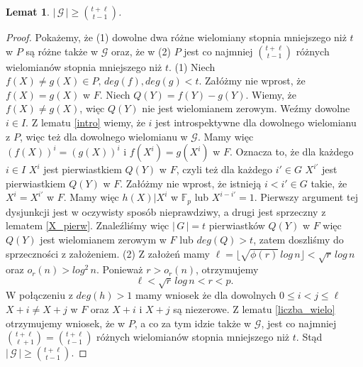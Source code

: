\documentclass[declaration,shortabstract]{iithesis}
\theoremstyle{definition}
\theoremstyle{remark} \newtheorem{observation}{Obserwacja}
\theoremstyle{plain} \newtheorem{theorem}{Twierdzenie}
\theoremstyle{plain} \newtheorem{lemma}{Lemat}
\theoremstyle{remark} \newtheorem*{remark*}{Uwaga}
\theoremstyle{reminder} \newtheorem*{reminder*}{Przypomnienie}
\begin{document}
\begin{lemma} \label{lower}
	$| \, \mathcal{G} \,| \geq {t + \ell \choose t - 1}$.
\end{lemma}
	
\begin{proof}
	Pokażemy, że (1) dowolne dwa różne wielomiany stopnia mniejszego niż $t$ w $P$ są różne także w $\mathcal{G}$ oraz, że w (2) $P$ jest co najmniej  ${t + \ell \choose t - 1}$ różnych wielomianów stopnia mniejszego niż $t$. 
	\newline
	(1) Niech $f(X) \neq g(X) \in P, \, deg(f), deg(g) < t$. Załóżmy nie wprost, że $f(X) = g(X)$ w $F$. 
	Niech $Q(Y) = f(Y) - g(Y)$. Wiemy, że $f(X) \neq g(X)$, więc $Q(Y)$ nie jest wielomianem zerowym. Weźmy dowolne $i \in I$. Z lematu \ref{intro} wiemy, że $i$ jest introspektywne dla dowolnego wielomianu z $P$, więc też dla dowolnego wielomianu w $\mathcal{G}$. Mamy więc $(f(X))^i = (g(X))^i$ i $f(X^i) = g(X^i)$ w $F$. Oznacza to, że dla każdego $i \in I$ $X^i$ jest pierwiastkiem $Q(Y)$ w $F$, czyli też dla każdego $i' \in G$ $X^{i'}$ jest pierwiastkiem $Q(Y)$ w $F$. Załóżmy nie wprost, że istnieją $i < i' \in G$ takie, że $X^i = X^{i'}$ w $F$. Mamy więc $h(X) | X^i$ w $\mathbb{F}_p$ lub $X^{i - i'} = 1$. Pierwszy argument tej dysjunkcji jest w oczywisty sposób nieprawdziwy, a drugi jest sprzeczny z lematem \ref{X_pierw}.
	Znaleźliśmy więc $|\,G\,| = t$ pierwiastków $Q(Y)$ w $F$ więc $Q(Y)$ jest wielomianem zerowym w $F$ lub $deg(Q) > t$, zatem doszliśmy do sprzeczności z założeniem.\newline
	(2) Z założeń mamy $\ell = \lfloor \sqrt{\phi(r)} \, log\, n \rfloor < \sqrt{r} \, log \, n $ oraz $o_r(n) > log^2 \, n$. Ponieważ $r > o_r(n)$, otrzymujemy \[\ell < \sqrt{r} \, log \, n < r < p.\] W połączeniu z $deg(h) > 1$ mamy wniosek że dla dowolnych $0 \leq i < j \leq \ell$ $X + i \neq X + j$ w $F$ oraz $X + i$ i $X + j$ są niezerowe. 
	\newline Z lematu \ref{liczba_wielo} otrzymujemy wniosek, że w $P$, a co za tym idzie także w $\mathcal{G}$, jest co najmniej ${t + \ell \choose \ell + 1} = {t + \ell \choose t - 1}$ różnych wielomianów stopnia mniejszego niż $t$. Stąd $| \, \mathcal{G} \, | \geq {t + \ell \choose t - 1}$.
\end{proof}
	
\end{document}
